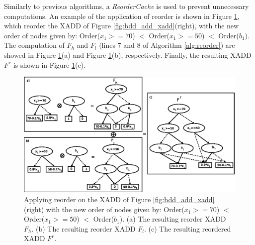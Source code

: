 \documentclass[twoside,11pt]{article}
\begin{document}
Similarly to previous algorithms, a \emph{ReorderCache} is used to prevent unnecessary computations. An example of the application of reorder is shown in Figure \ref{fig:reorder}, which reorder the XADD of Figure \ref{fig:bdd_add_xadd}(right), with the new order of nodes given by: Order($x_1>=70$) $<$ Order($x_1>=50$) $<$ Order($b_1$). The computation of $F_h$ and $F_l$ (lines 7 and 8 of Algorithm \ref{alg:reorder}) are showed in Figure \ref{fig:reorder}(a) and Figure \ref{fig:reorder}(b), respectively. Finally, the resulting XADD $F^r$ is shown in Figure \ref{fig:reorder}(c). 

\begin{figure}[t!]
\centering
\includegraphics[width=1\textwidth]{FiguresSource/reorder.eps}
\vspace{-2mm}
\caption{%
Applying reorder on the XADD of Figure \ref{fig:bdd_add_xadd} (right) with the new order of nodes given by: Order($x_1>=70$) $<$ Order($x_1>=50$) $<$ Order($b_1$). (a) The resulting reorder XADD $F_h$. (b) The resulting reorder XADD $F_l$. (c) The resulting reordered XADD $F^r$.} 
\label{fig:reorder}
\end{figure}
\end{document}
